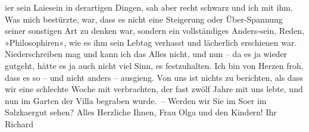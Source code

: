\begin{ledgroupsized}[t]{13cm}
                  i{\geminationm}er sein Laiesein in derartigen Dingen, sah aber
               recht schwarz {\pb}und ich mit ihm. Was
               mich bestürzte, war, dass es nicht eine Steigerung oder Über-Spannung seiner
               sonstigen Art zu denken war, sondern ein vollständiges Anders-sein, Reden,
               »Philosophiren«, wie es ihm sein Lebtag verhasst und lächerlich erschienen war.
               Niederschreiben mag und kann ich das Alles nicht, und nun – da es ja wieder gutgeht,
               hätte es ja auch nicht viel Sinn, es festzuhalten.\pend
           \pstart
           Ich bin von Herzen froh, dass es so – und nicht anders – ausgieng.\pend
           \pstart
           Von uns ist nichts zu berichten, als dass wir eine schlechte Woche mit \label{KLL02266_AS-1v}\label{KLL02266_AS-1h}
               verbrachten, der fast zwölf Jahre mit uns lebte, und nun im Garten der Villa begraben
               wurde. –\pend
           \pstart
           Werden wir Sie im So{\geminationm}er im Salzka{\geminationm}ergut sehen?\pend
           \pstart
           Alles Herzliche Ihnen, Frau Olga und den Kindern! Ihr\pend
           \pstart \spacefill\mbox{Richard}\pend{}\endnumbering{}\end{ledgroupsized}  \newcommand{\dateiname}{L02266}\newcommand{\titel}{Richard Beer-Hofmann an Arthur Schnitzler, 18. 7. 1917}\newcommand{\editorInnen}{Martin Anton Müller und Gerd-Hermann Susen}
      